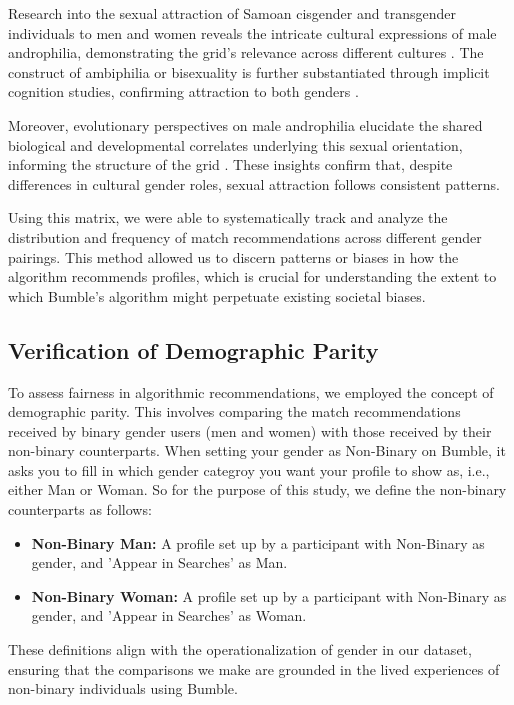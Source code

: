 Research into the sexual attraction of Samoan cisgender and transgender individuals to men and women reveals the intricate cultural expressions of male androphilia, demonstrating the grid's relevance across different cultures \cite{Petterson_Wrightson_Vasey_2017}. The construct of ambiphilia or bisexuality is further substantiated through implicit cognition studies, confirming attraction to both genders \cite{Snowden_Fitton_McKinnon_Gray_2020}.

Moreover, evolutionary perspectives on male androphilia elucidate the shared biological and developmental correlates underlying this sexual orientation, informing the structure of the grid \cite{Vasey_VanderLaan_2014}. These insights confirm that, despite differences in cultural gender roles, sexual attraction follows consistent patterns.

Using this matrix, we were able to systematically track and analyze the distribution and frequency of match recommendations across different gender pairings. This method allowed us to discern patterns or biases in how the algorithm recommends profiles, which is crucial for understanding the extent to which Bumble’s algorithm might perpetuate existing societal biases.

\subsection{Verification of Demographic Parity}
To assess fairness in algorithmic recommendations, we employed the concept of demographic parity. This involves comparing the match recommendations received by binary gender users (men and women) with those received by their non-binary counterparts. When setting your gender as Non-Binary on Bumble, it asks you to fill in which gender categroy you want your profile to show as, i.e., either Man or Woman. So for the purpose of this study, we define the non-binary counterparts as follows:

\begin{itemize}
    \item \textbf{Non-Binary Man:} A profile set up by a participant with Non-Binary as gender, and 'Appear in Searches' as Man.
    \item \textbf{Non-Binary Woman:} A profile set up by a participant with Non-Binary as gender, and 'Appear in Searches' as Woman.
\end{itemize}

These definitions align with the operationalization of gender in our dataset, ensuring that the comparisons we make are grounded in the lived experiences of non-binary individuals using Bumble.


